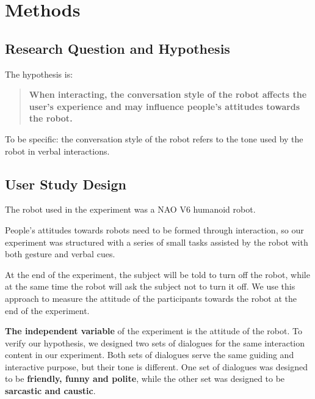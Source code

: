 \documentclass[conference]{IEEEtran}
\begin{document}
\section{Methods}


\subsection{Research Question and Hypothesis}


The hypothesis is:

\begin{quote}
    \textbf{When interacting, the conversation style of the robot affects the user's experience and may influence people's attitudes towards the robot.}
\end{quote}

To be specific: the conversation style of the robot refers to the tone used by the robot in verbal interactions.



\subsection{User Study Design}


The robot used in the experiment was a NAO V6 humanoid robot.


People's attitudes towards robots need to be formed through interaction, so our experiment was structured with a series of small tasks assisted by the robot with both gesture and verbal cues.  

At the end of the experiment, the subject will be told to turn off the robot, while at the same time the robot will ask the subject not to turn it off. We use this approach to measure the attitude of the participants towards the robot at the end of the experiment.

\textbf{The independent variable} of the experiment is the attitude of the robot. To verify our hypothesis, we designed two sets of dialogues for the same interaction content in our experiment. Both sets of dialogues serve the same guiding and interactive purpose, but their tone is different. One set of dialogues was designed to be \textbf{friendly, funny and polite}, while the other set was designed to be \textbf{sarcastic and caustic}.
\end{document}
